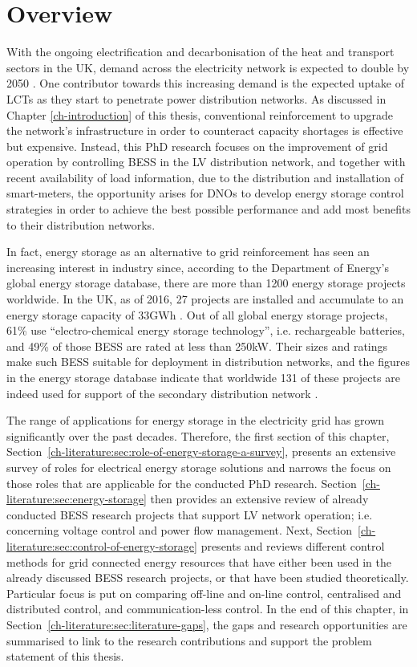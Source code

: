 \section{Overview}
\label{ch-literature:sec:overview}

With the ongoing electrification and decarbonisation of the heat and transport sectors in the UK, demand across the electricity network is expected to double by 2050 \cite{Wilks2010}.
One contributor towards this increasing demand is the expected uptake of LCTs as they start to penetrate power distribution networks.
As discussed in Chapter \ref{ch-introduction} of this thesis, conventional reinforcement to upgrade the network's infrastructure in order to counteract capacity shortages is effective but expensive.
Instead, this PhD research focuses on the improvement of grid operation by controlling BESS in the LV distribution network, and together with recent availability of load information, due to the distribution and installation of smart-meters, the opportunity arises for DNOs to develop energy storage control strategies in order to achieve the best possible performance and add most benefits to their distribution networks.

In fact, energy storage as an alternative to grid reinforcement has seen an increasing interest in industry since, according to the Department of Energy's global energy storage database, there are more than 1200 energy storage projects worldwide.
In the UK, as of 2016, 27 projects are installed and accumulate to an energy storage capacity of 33GWh \cite{Garton2016}.
Out of all global energy storage projects, 61\% use ``electro-chemical energy storage technology'', i.e. rechargeable batteries, and 49\% of those BESS are rated at less than 250kW.
Their sizes and ratings make such BESS suitable for deployment in distribution networks, and the figures in the energy storage database indicate that worldwide 131 of these projects are indeed used for support of the secondary distribution network \cite{DOE-GESD}.

The range of applications for energy storage in the electricity grid has grown significantly over the past decades.
Therefore, the first section of this chapter, Section~\ref{ch-literature:sec:role-of-energy-storage-a-survey}, presents an extensive survey of roles for electrical energy storage solutions and narrows the focus on those roles that are applicable for the conducted PhD research.
Section~\ref{ch-literature:sec:energy-storage} then provides an extensive review of already conducted BESS research projects that support LV network operation; i.e. concerning voltage control and power flow management.
Next, Section~\ref{ch-literature:sec:control-of-energy-storage} presents and reviews different control methods for grid connected energy resources that have either been used in the already discussed BESS research projects, or that have been studied theoretically.
Particular focus is put on comparing off-line and on-line control, centralised and distributed control, and communication-less control.
In the end of this chapter, in Section~\ref{ch-literature:sec:literature-gaps}, the gaps and research opportunities are summarised to link to the research contributions and support the problem statement of this thesis.
